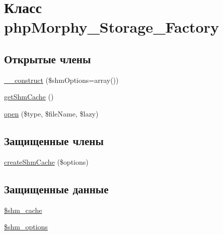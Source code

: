 \hypertarget{classphpMorphy__Storage__Factory}{
\section{Класс phpMorphy\_\-Storage\_\-Factory}
\label{classphpMorphy__Storage__Factory}
}
\subsection*{Открытые члены}
\begin{DoxyCompactItemize}
\item 
\hyperlink{classphpMorphy__Storage__Factory_a1099ba6f3820206f02cfd23b2b7971bc}{\_\-\_\-construct} (\$shmOptions=array())
\item 
\hyperlink{classphpMorphy__Storage__Factory_afc4ad8568e1fcbf79efcfb3135f4fdce}{getShmCache} ()
\item 
\hyperlink{classphpMorphy__Storage__Factory_a130a11542fbacb7e4488ef255b960f4f}{open} (\$type, \$fileName, \$lazy)
\end{DoxyCompactItemize}
\subsection*{Защищенные члены}
\begin{DoxyCompactItemize}
\item 
\hyperlink{classphpMorphy__Storage__Factory_a4fc191bd312cea40b01a2eccbd9f1b29}{createShmCache} (\$options)
\end{DoxyCompactItemize}
\subsection*{Защищенные данные}
\begin{DoxyCompactItemize}
\item 
\hyperlink{classphpMorphy__Storage__Factory_a790271d899e8de99f0f348ab2041eb8d}{\$shm\_\-cache}
\item 
\hyperlink{classphpMorphy__Storage__Factory_a5890d822f98dc68c8d71ee7d4d5b570b}{\$shm\_\-options}
\end{DoxyCompactItemize}


